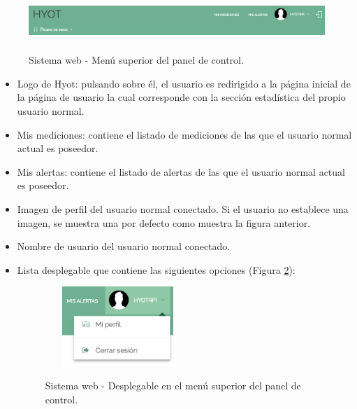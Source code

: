 \documentclass[12pt,a4paper, twoside]{report}
\begin{document}
		\begin{figure}[!ht]   
			\caption{Sistema web - Menú superior del panel de control.} 
			\begin{center} 
	 			\includegraphics[width=16cm, height=1.5cm]{Images/userGuide/web/normalUserMenuSuperior} \\
				\label{fig:web_normalUserMenu} 
			\end{center}  	
		\end{figure}
			
	\begin{itemize}
	
		\item Logo de Hyot: pulsando sobre él, el usuario es redirigido a la página inicial de la página de usuario la cual corresponde con la sección estadística del propio usuario normal.
		\item Mis mediciones: contiene el listado de mediciones de las que el usuario normal actual es poseedor.
		\item Mis alertas: contiene el listado de alertas de las que el usuario normal actual es poseedor.
		\item Imagen de perfil del usuario normal conectado. Si el usuario no establece una imagen, se muestra una por defecto como muestra la figura anterior.
		\item Nombre de usuario del usuario normal conectado.
		\item Lista desplegable que contiene las siguientes opciones (Figura \ref{fig:web_normalUserMenuSuperiorDesplegable}):
				
			\begin{figure}[!ht]   
				\caption{Sistema web - Desplegable en el menú superior del panel de control.} 
				\begin{center} 
	 				\includegraphics[width=5.5cm, height=3cm]{Images/userGuide/web/normalUserMenuSuperiorDesplegable} \\
					\label{fig:web_normalUserMenuSuperiorDesplegable} 
				\end{center}  	
			\end{figure}
			

\end{itemize}
\end{document}
